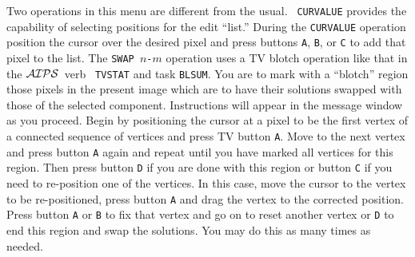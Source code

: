 \documentclass[twoside]{article}
\newcommand{\AIPS}{{$\cal AIPS\/$}}
\begin{document}
Two operations in this menu are different from the usual.  {\tt
  CURVALUE} provides the capability of selecting positions for the
edit ``list.''  During the {\tt CURVALUE} operation position the
cursor over the desired pixel and press buttons {\tt A}, {\tt B}, or
{\tt C} to add that pixel to the list.  The {\tt SWAP $n$-$m$}
operation uses a TV blotch operation like that in the \AIPS\ verb {\tt
  TVSTAT} and task {\tt BLSUM}\@.  You are to mark with a ``blotch''
region those pixels in the present image which are to have their
solutions swapped with those of the selected component.  Instructions
will appear in the message window as you proceed.  Begin by
positioning the cursor at a pixel to be the first vertex of a
connected sequence of vertices and press TV button {\tt A}\@.  Move to
the next vertex and press button {\tt A} again and repeat until you
have marked all vertices for this region.  Then press button {\tt D}
if you are done with this region or button {\tt C} if you need to
re-position one of the vertices.  In this case, move the cursor to the
vertex to be re-positioned, press button {\tt A} and drag the vertex to
the corrected position.  Press button {\tt A} or {\tt B} to fix that
vertex and go on to reset another vertex or {\tt D} to end this region
and swap the solutions.  You may do this as many times as needed.
\end{document}
